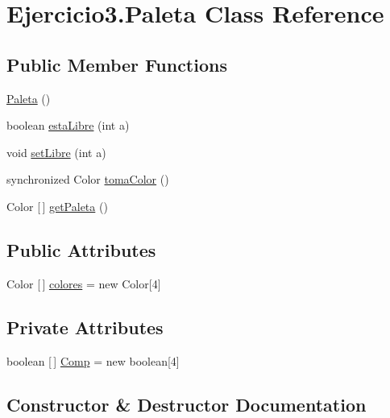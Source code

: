 \hypertarget{class_ejercicio3_1_1_paleta}{}\section{Ejercicio3.\+Paleta Class Reference}
\label{class_ejercicio3_1_1_paleta}
\subsection*{Public Member Functions}
\begin{DoxyCompactItemize}
\item 
\mbox{\hyperlink{class_ejercicio3_1_1_paleta_a39dd8e80bfeee979782583154781986b}{Paleta}} ()
\item 
boolean \mbox{\hyperlink{class_ejercicio3_1_1_paleta_a4d66d1d99e8559d15abe32808bd51f00}{esta\+Libre}} (int a)
\item 
void \mbox{\hyperlink{class_ejercicio3_1_1_paleta_abd1d94b50d8ff18205c7265f3002fbb6}{set\+Libre}} (int a)
\item 
synchronized Color \mbox{\hyperlink{class_ejercicio3_1_1_paleta_a0e3c5e71ab1f44028fa072043a154cd0}{toma\+Color}} ()
\item 
Color \mbox{[}$\,$\mbox{]} \mbox{\hyperlink{class_ejercicio3_1_1_paleta_a2c27da86276ac62593e2e8e1bbfa7a12}{get\+Paleta}} ()
\end{DoxyCompactItemize}
\subsection*{Public Attributes}
\begin{DoxyCompactItemize}
\item 
Color \mbox{[}$\,$\mbox{]} \mbox{\hyperlink{class_ejercicio3_1_1_paleta_ad197acb4f704b18fcf00ad02ad45b47d}{colores}} = new Color\mbox{[}4\mbox{]}
\end{DoxyCompactItemize}
\subsection*{Private Attributes}
\begin{DoxyCompactItemize}
\item 
boolean \mbox{[}$\,$\mbox{]} \mbox{\hyperlink{class_ejercicio3_1_1_paleta_a1e0d32a96f88fc79dcca5cf1f5758f6b}{Comp}} = new boolean\mbox{[}4\mbox{]}
\end{DoxyCompactItemize}


\subsection{Constructor \& Destructor Documentation}
\mbox{\label{class_ejercicio3_1_1_paleta_a39dd8e80bfeee979782583154781986b}} 
